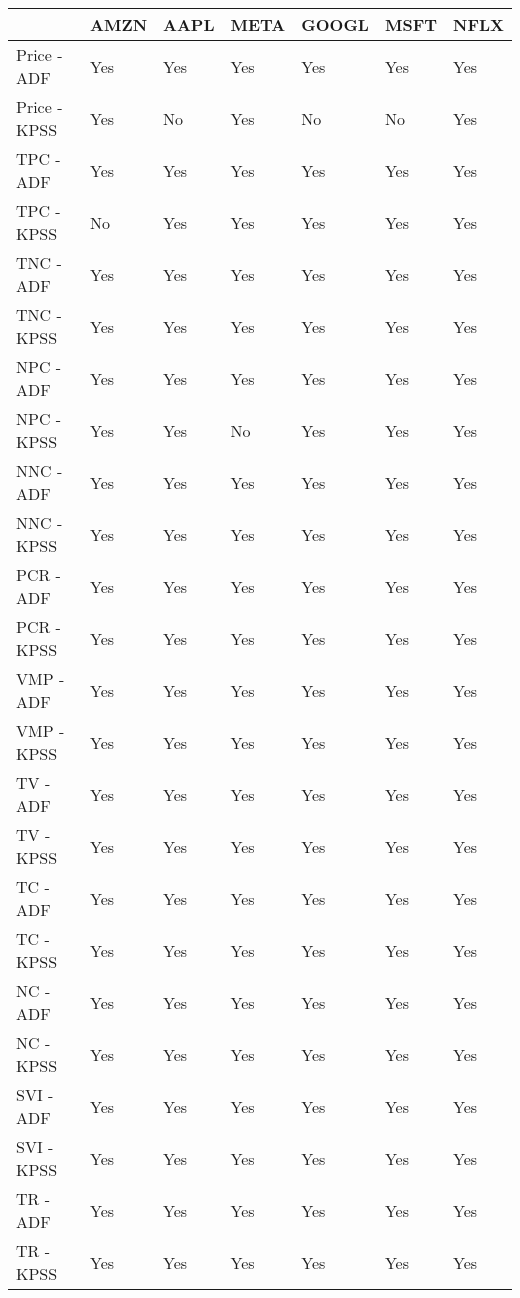 \begin{tabular}{lllllll}
\toprule
{} & AMZN & AAPL & META & GOOGL & MSFT & NFLX \\
\midrule
Price - ADF  &  Yes &  Yes &  Yes &   Yes &  Yes &  Yes \\
Price - KPSS &  Yes &   No &  Yes &    No &   No &  Yes \\
TPC - ADF    &  Yes &  Yes &  Yes &   Yes &  Yes &  Yes \\
TPC - KPSS   &   No &  Yes &  Yes &   Yes &  Yes &  Yes \\
TNC - ADF    &  Yes &  Yes &  Yes &   Yes &  Yes &  Yes \\
TNC - KPSS   &  Yes &  Yes &  Yes &   Yes &  Yes &  Yes \\
NPC - ADF    &  Yes &  Yes &  Yes &   Yes &  Yes &  Yes \\
NPC - KPSS   &  Yes &  Yes &   No &   Yes &  Yes &  Yes \\
NNC - ADF    &  Yes &  Yes &  Yes &   Yes &  Yes &  Yes \\
NNC - KPSS   &  Yes &  Yes &  Yes &   Yes &  Yes &  Yes \\
PCR - ADF    &  Yes &  Yes &  Yes &   Yes &  Yes &  Yes \\
PCR - KPSS   &  Yes &  Yes &  Yes &   Yes &  Yes &  Yes \\
VMP - ADF    &  Yes &  Yes &  Yes &   Yes &  Yes &  Yes \\
VMP - KPSS   &  Yes &  Yes &  Yes &   Yes &  Yes &  Yes \\
TV - ADF     &  Yes &  Yes &  Yes &   Yes &  Yes &  Yes \\
TV - KPSS    &  Yes &  Yes &  Yes &   Yes &  Yes &  Yes \\
TC - ADF     &  Yes &  Yes &  Yes &   Yes &  Yes &  Yes \\
TC - KPSS    &  Yes &  Yes &  Yes &   Yes &  Yes &  Yes \\
NC - ADF     &  Yes &  Yes &  Yes &   Yes &  Yes &  Yes \\
NC - KPSS    &  Yes &  Yes &  Yes &   Yes &  Yes &  Yes \\
SVI - ADF    &  Yes &  Yes &  Yes &   Yes &  Yes &  Yes \\
SVI - KPSS   &  Yes &  Yes &  Yes &   Yes &  Yes &  Yes \\
TR - ADF     &  Yes &  Yes &  Yes &   Yes &  Yes &  Yes \\
TR - KPSS    &  Yes &  Yes &  Yes &   Yes &  Yes &  Yes \\
\bottomrule
\end{tabular}
